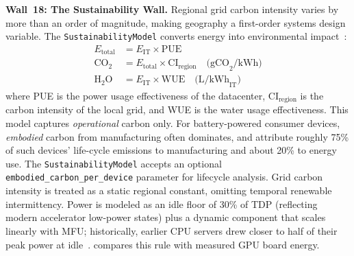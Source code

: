 \documentclass[10pt,twocolumn]{article}
\begin{document}
\textbf{Wall~18: The Sustainability Wall.} Regional grid carbon intensity varies by more than an order of magnitude, making geography a first-order systems design variable. The \texttt{SustainabilityModel} converts energy into environmental impact~\citep{patterson2021carbon}:
\begin{align}
\label{eq:sustainability}
E_{\text{total}} &= E_{\text{IT}} \times \text{PUE} \\
\text{CO}_2 &= E_{\text{total}} \times \text{CI}_{\text{region}} \quad \text{(gCO}_2\text{/kWh)} \\
\text{H}_2\text{O} &= E_{\text{IT}} \times \text{WUE} \quad \text{(L/kWh}_{\text{IT}}\text{)}
\end{align}
where PUE is the power usage effectiveness of the datacenter, $\text{CI}_{\text{region}}$ is the carbon intensity of the local grid, and WUE is the water usage effectiveness. This model captures \emph{operational} carbon only. For battery-powered consumer devices, \emph{embodied} carbon from manufacturing often dominates, and \citet{gupta2021chasing} attribute roughly 75\% of such devices' life-cycle emissions to manufacturing and about 20\% to energy use. The \texttt{SustainabilityModel} accepts an optional \texttt{embodied\_carbon\_per\_device} parameter for lifecycle analysis. Grid carbon intensity is treated as a static regional constant, omitting temporal renewable intermittency. Power is modeled as an idle floor of 30\% of TDP (reflecting modern accelerator low-power states) plus a dynamic component that scales linearly with MFU; historically, earlier CPU servers drew closer to half of their peak power at idle~\citep{barroso2007}.  compares this rule with measured GPU board energy.
\end{document}
